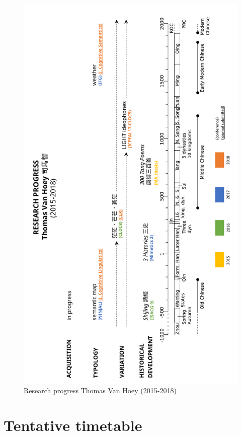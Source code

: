 \documentclass[12pt,]{article}
\theoremstyle{definition}
\theoremstyle{definition}
\theoremstyle{definition}
\theoremstyle{remark}
\begin{document}
\begin{figure}
\centering
\includegraphics{progress.pdf}
\caption{\label{fig:progress}Research progress Thomas Van Hoey (2015-2018)}
\end{figure}

\section{Tentative timetable}\label{tentative-timetable}
\end{document}
